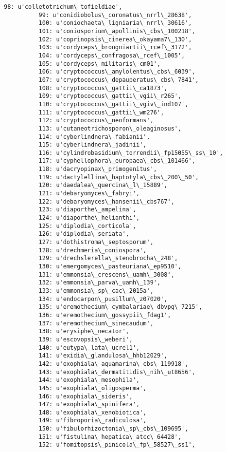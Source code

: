 \documentclass[11pt]{article}
\begin{document}
\begin{Verbatim}[commandchars=\\\{\}]
          98: u'colletotrichum\_tofieldiae',
          99: u'conidiobolus\_coronatus\_nrrl\_28638',
          100: u'coniochaeta\_ligniaria\_nrrl\_30616',
          101: u'coniosporium\_apollinis\_cbs\_100218',
          102: u'coprinopsis\_cinerea\_okayama7\_130',
          103: u'cordyceps\_brongniartii\_rcef\_3172',
          104: u'cordyceps\_confragosa\_rcef\_1005',
          105: u'cordyceps\_militaris\_cm01',
          106: u'cryptococcus\_amylolentus\_cbs\_6039',
          107: u'cryptococcus\_depauperatus\_cbs\_7841',
          108: u'cryptococcus\_gattii\_ca1873',
          109: u'cryptococcus\_gattii\_vgii\_r265',
          110: u'cryptococcus\_gattii\_vgiv\_ind107',
          111: u'cryptococcus\_gattii\_wm276',
          112: u'cryptococcus\_neoformans',
          113: u'cutaneotrichosporon\_oleaginosus',
          114: u'cyberlindnera\_fabianii',
          115: u'cyberlindnera\_jadinii',
          116: u'cylindrobasidium\_torrendii\_fp15055\_ss\_10',
          117: u'cyphellophora\_europaea\_cbs\_101466',
          118: u'dacryopinax\_primogenitus',
          119: u'dactylellina\_haptotyla\_cbs\_200\_50',
          120: u'daedalea\_quercina\_l\_15889',
          121: u'debaryomyces\_fabryi',
          122: u'debaryomyces\_hansenii\_cbs767',
          123: u'diaporthe\_ampelina',
          124: u'diaporthe\_helianthi',
          125: u'diplodia\_corticola',
          126: u'diplodia\_seriata',
          127: u'dothistroma\_septosporum',
          128: u'drechmeria\_coniospora',
          129: u'drechslerella\_stenobrocha\_248',
          130: u'emergomyces\_pasteuriana\_ep9510',
          131: u'emmonsia\_crescens\_uamh\_3008',
          132: u'emmonsia\_parva\_uamh\_139',
          133: u'emmonsia\_sp\_cac\_2015a',
          134: u'endocarpon\_pusillum\_z07020',
          135: u'eremothecium\_cymbalariae\_dbvpg\_7215',
          136: u'eremothecium\_gossypii\_fdag1',
          137: u'eremothecium\_sinecaudum',
          138: u'erysiphe\_necator',
          139: u'escovopsis\_weberi',
          140: u'eutypa\_lata\_ucrel1',
          141: u'exidia\_glandulosa\_hhb12029',
          142: u'exophiala\_aquamarina\_cbs\_119918',
          143: u'exophiala\_dermatitidis\_nih\_ut8656',
          144: u'exophiala\_mesophila',
          145: u'exophiala\_oligosperma',
          146: u'exophiala\_sideris',
          147: u'exophiala\_spinifera',
          148: u'exophiala\_xenobiotica',
          149: u'fibroporia\_radiculosa',
          150: u'fibulorhizoctonia\_sp\_cbs\_109695',
          151: u'fistulina\_hepatica\_atcc\_64428',
          152: u'fomitopsis\_pinicola\_fp\_58527\_ss1',

\end{Verbatim}
\end{document}
